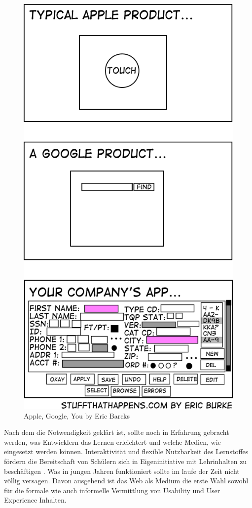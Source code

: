 \documentclass[a4paper, 12pt, twoside, BCOR=20mm, DIV=calc, abstracton, parskip=half*, toc=bibliography, toc=listof, headsepline, footsepline, headings=small, numbers=enddot]{scrreprt}
\begin{document}
	\begin{figure}[h]
		\centering
		\includegraphics[scale=0.7]{Bild/Usability_Comic.jpg}
		\caption{Apple, Google, You by Eric Barcks}
	\end{figure}
	Nach dem die Notwendigkeit geklärt ist, sollte noch in Erfahrung gebracht werden, was Entwicklern das Lernen erleichtert und welche Medien, wie eingesetzt werden können. 
	Interaktivität und flexible Nutzbarkeit des Lernstoffes fördern die Bereitschaft von Schülern sich in  Eigeninitiative mit Lehrinhalten zu beschäftigen \cite[S.32 ff.]{beck2000eigenstandiges}. Was in jungen Jahren funktioniert sollte im laufe der Zeit nicht völlig versagen. Davon ausgehend ist das Web als Medium die erste Wahl sowohl für die formale wie auch informelle Vermittlung von Usability und User Experience Inhalten. 
	
\end{document}
